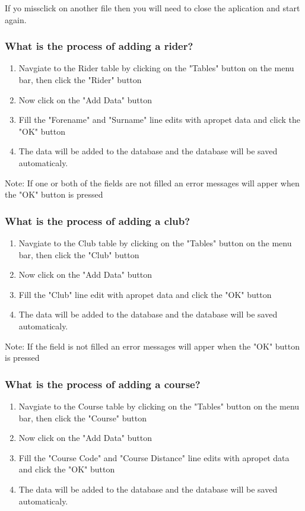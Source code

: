 If yo missclick on another file then you will need to close the aplication and start again.

\subsubsection{What is the process of adding a rider?}
\begin{enumerate}
\item Navgiate to the Rider table by clicking on the "Tables" button on the menu bar, then click the "Rider" button
\item Now click on the "Add Data" button
\item Fill the "Forename" and "Surname" line edits with apropet data and click the "OK" button
\item The data will be added to the database and the database will be saved automaticaly.
\end{enumerate}

Note: If one or both of the fields are not filled an error messages will apper when the "OK" button is pressed

\subsubsection{What is the process of adding a club?}
\begin{enumerate}
\item Navgiate to the Club table by clicking on the "Tables" button on the menu bar, then click the "Club" button
\item Now click on the "Add Data" button
\item Fill the "Club" line edit with apropet data and click the "OK" button
\item The data will be added to the database and the database will be saved automaticaly.
\end{enumerate}

Note: If  the field is not filled an error messages will apper when the "OK" button is pressed

\subsubsection{What is the process of adding a course?}
\begin{enumerate}
\item Navgiate to the Course table by clicking on the "Tables" button on the menu bar, then click the "Course" button
\item Now click on the "Add Data" button
\item Fill the "Course Code" and "Course Distance" line edits with apropet data and click the "OK" button
\item The data will be added to the database and the database will be saved automaticaly.
\end{enumerate}

